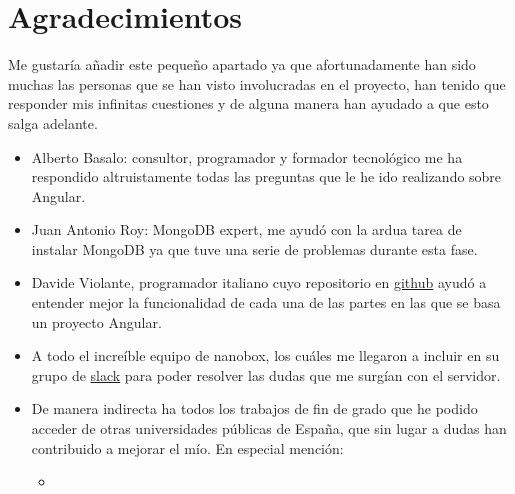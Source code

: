 \section{Agradecimientos}\label{reconocimientos}
Me gustaría añadir este pequeño apartado ya que afortunadamente han sido muchas las personas que se han visto involucradas en el proyecto, han tenido que responder mis infinitas cuestiones y de alguna manera han ayudado a que esto salga adelante. 
\begin{itemize}
		\item Alberto Basalo: consultor, programador y formador tecnológico me ha respondido altruistamente todas las preguntas que le he ido realizando sobre Angular. 
		\item Juan Antonio Roy: MongoDB expert, me ayudó con la ardua tarea de instalar MongoDB ya que tuve una serie de problemas durante esta fase. 
		\item Davide Violante, programador italiano cuyo repositorio en \href{https://github.com/DavideViolante/Angular-Full-Stack}{github} ayudó a entender mejor la funcionalidad de cada una de las partes en las que se basa un proyecto Angular. 
		\item A todo el increíble equipo de nanobox, los cuáles me llegaron a incluir en su grupo de \href{https://slack.com/}{slack} para poder resolver las dudas que me surgían con el servidor.
		\item De manera indirecta ha todos los trabajos de fin de grado que he podido acceder de otras universidades públicas de España, que sin lugar a dudas han contribuido a mejorar el mío. En especial mención:
		\begin{itemize}
			\item 
		\end{itemize}
		
\end{itemize}


 
 